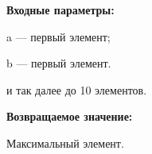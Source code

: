 \textbf{Входные параметры:}

 a --- первый элемент;
	
 b --- первый элемент.

 и так далее до 10 элементов.

\textbf{Возвращаемое значение:}

Максимальный элемент.